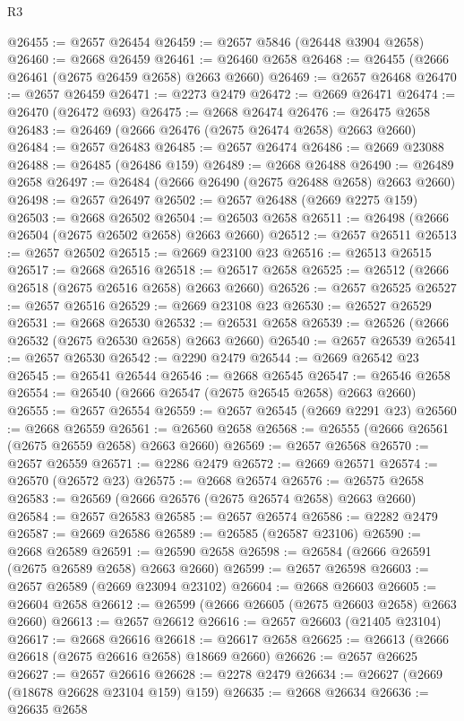 \begin{lexlean}{R3}
\begin{coremodule}
@26455 := @2657 @26454
@26459 := @2657 @5846 (@26448 @3904 @2658)
@26460 := @2668 @26459
@26461 := @26460 @2658
@26468 := @26455 (@2666 @26461 (@2675 @26459 @2658) @2663 @2660)
@26469 := @2657 @26468
@26470 := @2657 @26459
@26471 := @2273 @2479
@26472 := @2669 @26471
@26474 := @26470 (@26472 @693)
@26475 := @2668 @26474
@26476 := @26475 @2658
@26483 := @26469 (@2666 @26476 (@2675 @26474 @2658) @2663 @2660)
@26484 := @2657 @26483
@26485 := @2657 @26474
@26486 := @2669 @23088
@26488 := @26485 (@26486 @159)
@26489 := @2668 @26488
@26490 := @26489 @2658
@26497 := @26484 (@2666 @26490 (@2675 @26488 @2658) @2663 @2660)
@26498 := @2657 @26497
@26502 := @2657 @26488 (@2669 @2275 @159)
@26503 := @2668 @26502
@26504 := @26503 @2658
@26511 := @26498 (@2666 @26504 (@2675 @26502 @2658) @2663 @2660)
@26512 := @2657 @26511
@26513 := @2657 @26502
@26515 := @2669 @23100 @23
@26516 := @26513 @26515
@26517 := @2668 @26516
@26518 := @26517 @2658
@26525 := @26512 (@2666 @26518 (@2675 @26516 @2658) @2663 @2660)
@26526 := @2657 @26525
@26527 := @2657 @26516
@26529 := @2669 @23108 @23
@26530 := @26527 @26529
@26531 := @2668 @26530
@26532 := @26531 @2658
@26539 := @26526 (@2666 @26532 (@2675 @26530 @2658) @2663 @2660)
@26540 := @2657 @26539
@26541 := @2657 @26530
@26542 := @2290 @2479
@26544 := @2669 @26542 @23
@26545 := @26541 @26544
@26546 := @2668 @26545
@26547 := @26546 @2658
@26554 := @26540 (@2666 @26547 (@2675 @26545 @2658) @2663 @2660)
@26555 := @2657 @26554
@26559 := @2657 @26545 (@2669 @2291 @23)
@26560 := @2668 @26559
@26561 := @26560 @2658
@26568 := @26555 (@2666 @26561 (@2675 @26559 @2658) @2663 @2660)
@26569 := @2657 @26568
@26570 := @2657 @26559
@26571 := @2286 @2479
@26572 := @2669 @26571
@26574 := @26570 (@26572 @23)
@26575 := @2668 @26574
@26576 := @26575 @2658
@26583 := @26569 (@2666 @26576 (@2675 @26574 @2658) @2663 @2660)
@26584 := @2657 @26583
@26585 := @2657 @26574
@26586 := @2282 @2479
@26587 := @2669 @26586
@26589 := @26585 (@26587 @23106)
@26590 := @2668 @26589
@26591 := @26590 @2658
@26598 := @26584 (@2666 @26591 (@2675 @26589 @2658) @2663 @2660)
@26599 := @2657 @26598
@26603 := @2657 @26589 (@2669 @23094 @23102)
@26604 := @2668 @26603
@26605 := @26604 @2658
@26612 := @26599 (@2666 @26605 (@2675 @26603 @2658) @2663 @2660)
@26613 := @2657 @26612
@26616 := @2657 @26603 (@21405 @23104)
@26617 := @2668 @26616
@26618 := @26617 @2658
@26625 := @26613 (@2666 @26618 (@2675 @26616 @2658) @18669 @2660)
@26626 := @2657 @26625
@26627 := @2657 @26616
@26628 := @2278 @2479
@26634 := @26627 (@2669 (@18678 @26628 @23104 @159) @159)
@26635 := @2668 @26634
@26636 := @26635 @2658

\end{coremodule}
\end{lexlean}
